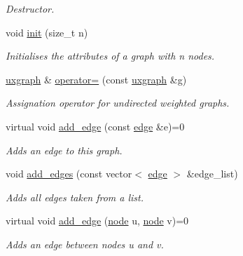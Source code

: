 \begin{DoxyCompactItemize}
\begin{DoxyCompactList}\small\item\em Destructor. \end{DoxyCompactList}\item 
void \hyperlink{classlgraph_1_1utils_1_1uxgraph_ab1e7ab39be6e8ca6149eef47dd51b155}{init} (size\+\_\+t n)
\begin{DoxyCompactList}\small\item\em Initialises the attributes of a graph with {\itshape n} nodes. \end{DoxyCompactList}\item 
\hyperlink{classlgraph_1_1utils_1_1uxgraph}{uxgraph} \& \hyperlink{classlgraph_1_1utils_1_1uxgraph_aae32def9779a7af6261fe8637094c664}{operator=} (const \hyperlink{classlgraph_1_1utils_1_1uxgraph}{uxgraph} \&g)
\begin{DoxyCompactList}\small\item\em Assignation operator for undirected weighted graphs. \end{DoxyCompactList}\item 
virtual void \hyperlink{classlgraph_1_1utils_1_1uxgraph_a737ddae69312e76211b51104dd1eea2f}{add\+\_\+edge} (const \hyperlink{namespacelgraph_1_1utils_a6510284ce1b1ae5dc97ce5d2de426e10}{edge} \&e)=0
\begin{DoxyCompactList}\small\item\em Adds an edge to this graph. \end{DoxyCompactList}\item 
void \hyperlink{classlgraph_1_1utils_1_1uxgraph_af6f7c0a2dc67706a07bd58f06b3dcf9f}{add\+\_\+edges} (const vector$<$ \hyperlink{namespacelgraph_1_1utils_a6510284ce1b1ae5dc97ce5d2de426e10}{edge} $>$ \&edge\+\_\+list)
\begin{DoxyCompactList}\small\item\em Adds all edges taken from a list. \end{DoxyCompactList}\item 
virtual void \hyperlink{classlgraph_1_1utils_1_1uxgraph_a97bdb6946478fa12a44d9780a4dc3ee6}{add\+\_\+edge} (\hyperlink{namespacelgraph_1_1utils_a7bd66ede3805ef121bc2835bd48de0cf}{node} u, \hyperlink{namespacelgraph_1_1utils_a7bd66ede3805ef121bc2835bd48de0cf}{node} v)=0
\begin{DoxyCompactList}\small\item\em Adds an edge between nodes {\itshape u} and {\itshape v}. \end{DoxyCompactList}\item 

\end{DoxyCompactItemize}
